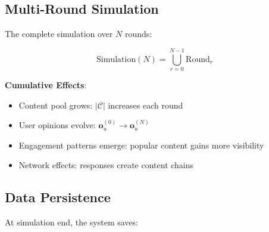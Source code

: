 \documentclass[11pt]{article}
\begin{document}
\subsection{Multi-Round Simulation}

The complete simulation over $N$ rounds:

\begin{equation}
\text{Simulation}(N) = \bigcup_{r=0}^{N-1} \text{Round}_r
\end{equation}

\textbf{Cumulative Effects}:
\begin{itemize}
    \item Content pool grows: $|\mathcal{C}|$ increases each round
    \item User opinions evolve: $\mathbf{o}_u^{(0)} \rightarrow \mathbf{o}_u^{(N)}$
    \item Engagement patterns emerge: popular content gains more visibility
    \item Network effects: responses create content chains
\end{itemize}

\subsection{Data Persistence}

At simulation end, the system saves:
\end{document}
